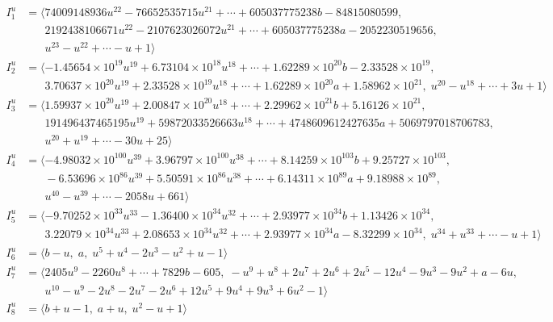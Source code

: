 \documentclass[1p]{elsarticle_modified}
\theoremstyle{definition}
\begin{document}
\begin{align*}
I^u_{1}&=\langle 
74009148936 u^{22}-76652535715 u^{21}+\cdots+605037775238 b-84815080599,\\
\phantom{I^u_{1}}&\phantom{= \langle  }2192438106671 u^{22}-2107623026072 u^{21}+\cdots+605037775238 a-2052230519656,\\
\phantom{I^u_{1}}&\phantom{= \langle  }u^{23}- u^{22}+\cdots- u+1\rangle \\
I^u_{2}&=\langle 
-1.45654\times10^{19} u^{19}+6.73104\times10^{18} u^{18}+\cdots+1.62289\times10^{20} b-2.33528\times10^{19},\\
\phantom{I^u_{2}}&\phantom{= \langle  }3.70637\times10^{20} u^{19}+2.33528\times10^{19} u^{18}+\cdots+1.62289\times10^{20} a+1.58962\times10^{21},\;u^{20}- u^{18}+\cdots+3 u+1\rangle \\
I^u_{3}&=\langle 
1.59937\times10^{20} u^{19}+2.00847\times10^{20} u^{18}+\cdots+2.29962\times10^{21} b+5.16126\times10^{21},\\
\phantom{I^u_{3}}&\phantom{= \langle  }191496437465195 u^{19}+59872033526663 u^{18}+\cdots+4748609612427635 a+5069797018706783,\\
\phantom{I^u_{3}}&\phantom{= \langle  }u^{20}+u^{19}+\cdots-30 u+25\rangle \\
I^u_{4}&=\langle 
-4.98032\times10^{100} u^{39}+3.96797\times10^{100} u^{38}+\cdots+8.14259\times10^{103} b+9.25727\times10^{103},\\
\phantom{I^u_{4}}&\phantom{= \langle  }-6.53696\times10^{86} u^{39}+5.50591\times10^{86} u^{38}+\cdots+6.14311\times10^{89} a+9.18988\times10^{89},\\
\phantom{I^u_{4}}&\phantom{= \langle  }u^{40}- u^{39}+\cdots-2058 u+661\rangle \\
I^u_{5}&=\langle 
-9.70252\times10^{33} u^{33}-1.36400\times10^{34} u^{32}+\cdots+2.93977\times10^{34} b+1.13426\times10^{34},\\
\phantom{I^u_{5}}&\phantom{= \langle  }3.22079\times10^{34} u^{33}+2.08653\times10^{34} u^{32}+\cdots+2.93977\times10^{34} a-8.32299\times10^{34},\;u^{34}+u^{33}+\cdots- u+1\rangle \\
I^u_{6}&=\langle 
b- u,\;a,\;u^5+u^4-2 u^3- u^2+u-1\rangle \\
I^u_{7}&=\langle 
2405 u^9-2260 u^8+\cdots+7829 b-605,\;- u^9+u^8+2 u^7+2 u^6+2 u^5-12 u^4-9 u^3-9 u^2+a-6 u,\\
\phantom{I^u_{7}}&\phantom{= \langle  }u^{10}- u^9-2 u^8-2 u^7-2 u^6+12 u^5+9 u^4+9 u^3+6 u^2-1\rangle \\
I^u_{8}&=\langle 
b+u-1,\;a+u,\;u^2- u+1\rangle \\
\\
\end{align*}
\end{document}
